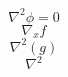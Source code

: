 \documentclass{article}
\begin{document}
\[ \nabla^2 \phi = 0 \]
\[ \nabla_x f \]
\[ \nabla^2(g) \]
\[ \nabla^2 \]
\end{document}
